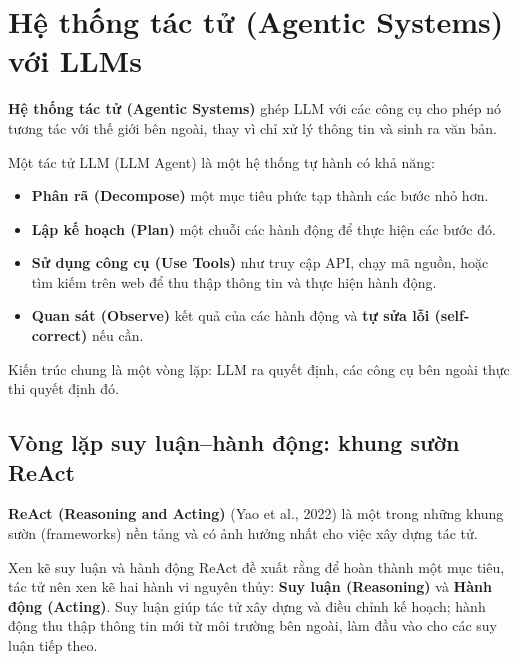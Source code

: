 
\section{Hệ thống tác tử (Agentic Systems) với LLMs}
\label{sec:agentic_systems}

\textbf{Hệ thống tác tử (Agentic Systems)} ghép LLM với các công cụ cho phép nó tương tác với thế giới bên ngoài, thay vì chỉ xử lý thông tin và sinh ra văn bản.

Một tác tử LLM (LLM Agent) là một hệ thống tự hành có khả năng:
\begin{itemize}
    \item \textbf{Phân rã (Decompose)} một mục tiêu phức tạp thành các bước nhỏ hơn.
    \item \textbf{Lập kế hoạch (Plan)} một chuỗi các hành động để thực hiện các bước đó.
    \item \textbf{Sử dụng công cụ (Use Tools)} như truy cập API, chạy mã nguồn, hoặc tìm kiếm trên web để thu thập thông tin và thực hiện hành động.
    \item \textbf{Quan sát (Observe)} kết quả của các hành động và \textbf{tự sửa lỗi (self-correct)} nếu cần.
\end{itemize}

Kiến trúc chung là một vòng lặp: LLM ra quyết định, các công cụ bên ngoài thực thi quyết định đó.

\subsection{Vòng lặp suy luận--hành động: khung sườn ReAct}
\label{ssec:react_framework}

\textbf{ReAct (Reasoning and Acting)} (Yao et al., 2022) là một trong những khung sườn (frameworks) nền tảng và có ảnh hưởng nhất cho việc xây dựng tác tử.

\begin{keyidea}{Xen kẽ suy luận và hành động}
ReAct đề xuất rằng để hoàn thành một mục tiêu, tác tử nên xen kẽ hai hành vi nguyên thủy: \textbf{Suy luận (Reasoning)} và \textbf{Hành động (Acting)}. Suy luận giúp tác tử xây dựng và điều chỉnh kế hoạch; hành động thu thập thông tin mới từ môi trường bên ngoài, làm đầu vào cho các suy luận tiếp theo.
\end{keyidea}

